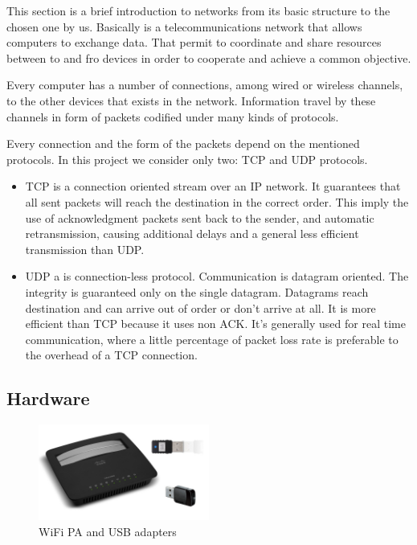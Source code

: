 This section is a brief introduction to networks from its basic structure to the chosen one by us.
Basically is a telecommunications network that allows computers to exchange data. That permit to coordinate and share resources between to and fro devices in order to cooperate and achieve a common objective. 

Every computer has a number of connections, among wired or wireless channels, to the other devices that exists in the network. Information travel by these channels in form of packets codified under many kinds of protocols. 

Every connection and the form of the packets depend on the mentioned protocols. In this project we consider only two: TCP and UDP protocols.

\begin{itemize}
	\item TCP is a connection oriented stream over an IP network. It guarantees that all sent packets will reach the destination in the correct order. This imply the use of acknowledgment packets sent back to the sender, and automatic retransmission, causing additional delays and a general less efficient transmission than UDP.

	\item UDP a is connection-less protocol. Communication is datagram oriented. The integrity is guaranteed only on the single datagram. Datagrams reach destination and can arrive out of order or don't arrive at all. It is more efficient than TCP because it uses non ACK. It's generally used for real time communication, where a little percentage of packet loss rate is preferable to the overhead of a TCP connection.
\end{itemize}

\subsection{Hardware}
\begin{figure}
	\includegraphics[width=0.5\textwidth]{../Images/c2/hardware_comm.jpg}
	\caption{WiFi PA and USB adapters}
	\label{fig:hardwareComm}
\end{figure}

